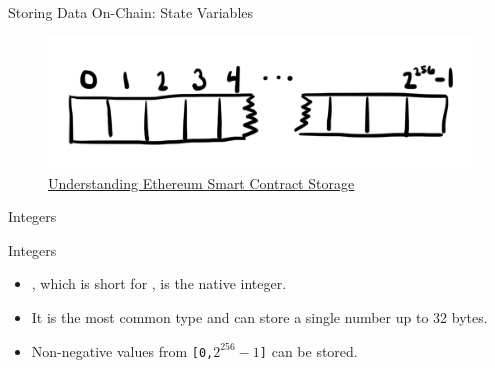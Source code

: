 \documentclass[handout]{beamer}
\begin{document}
\begin{frame}{Storing Data On-Chain: State Variables}

	\begin{figure}
		\includegraphics[scale=0.2]{../assets/images/sc_storage}
\caption{\link \href{https://programtheblockchain.com/posts/2018/03/09/understanding-ethereum-smart-contract-storage/}{Understanding Ethereum Smart Contract Storage}}
		\label{fig:sc_storage}
	\end{figure}


\end{frame}

\begin{frame}{Integers}

	\begin{samplecode}{Integers}
		
	\end{samplecode}
	\begin{itemize}
		\item<2->{, which is short for , is the native integer.}
		\item<3->{It is the most common type and can store a single number up to 32 bytes.}
		\item<4->{Non-negative values from \texttt{[0,$2^{256}-1$]} can be stored.}
	\end{itemize}

\end{frame}
\end{document}
